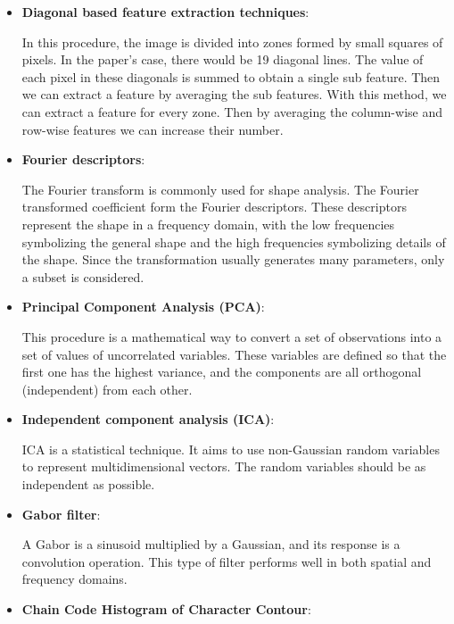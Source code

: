 \documentclass[conference]{IEEEtran}
\begin{document}
				\begin{itemize}
				
					\item \textbf{Diagonal based feature extraction techniques}:
					
						In this procedure, the image is divided into zones formed by small squares of pixels. 
						In the paper's case, there would be 19 diagonal lines. 
						The value of each pixel in these diagonals is summed to obtain a single sub feature. 
						Then we can extract a feature by averaging the sub features. 
						With this method, we can extract a feature for every zone. 
						Then by averaging the column-wise and row-wise features we can increase their number. 
						
					
					\item \textbf{Fourier descriptors}:
					
						The Fourier transform is commonly used for shape analysis. 
						The Fourier transformed coefficient form the Fourier descriptors. 
						These descriptors represent the shape in a frequency domain, with the low frequencies symbolizing the general shape and the high frequencies symbolizing details of the shape. 
						Since the transformation usually generates many parameters, only a subset is considered.
					
					
					\item \textbf{Principal Component Analysis (PCA)}:
					
						This procedure is a mathematical way to convert a set of observations into a set of values of uncorrelated variables. 
						These variables are defined so that the first one has the highest variance, and the components are all orthogonal (independent) from each other. 
						
					\item \textbf{Independent component analysis (ICA)}:
					
						ICA is a statistical technique. 
						It aims to use non-Gaussian random variables to represent multidimensional vectors. 
						The random variables should be as independent as possible. 
					
					\item \textbf{Gabor filter}:
					
						A Gabor is a sinusoid multiplied by a Gaussian, and its response is a convolution operation. 
						This type of filter performs well in both spatial and frequency domains. 
					
					\item \textbf{Chain Code Histogram of Character Contour}:
					

\end{itemize}
\end{document}
